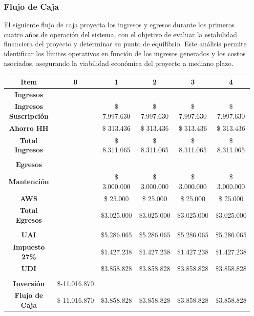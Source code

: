 \documentclass[12pt]{article}
\begin{document}
\subsubsection{Flujo de Caja}
El siguiente flujo de caja proyecta los ingresos y egresos durante los primeros cuatro años de operación del sistema, con el objetivo de evaluar la estabilidad financiera del proyecto y determinar su punto de equilibrio. Este análisis permite identificar los límites operativos en función de los ingresos generados y los costos asociados, asegurando la viabilidad económica del proyecto a mediano plazo.
\begin{table}[!h]
    \centering
    \begin{tabular}{|c|c|c|c|c|c|}
        \hline
         \textbf{Item} & 0 & 1 & 2 & 3 & 4 \\
         \hline
         \textbf{Ingresos}&&&&&\\
         \hline
         \textbf{Ingresos Suscripción} & & \$ 7.997.630 & \$ 7.997.630 & \$ 7.997.630 & \$ 7.997.630 \\
         \textbf{Ahorro HH} & & \$ 313.436 & \$ 313.436 & \$ 313.436 & \$ 313.436 \\
         \textbf{Total Ingresos} & & \$ 8.311.065 &\$ 8.311.065&\$ 8.311.065&\$ 8.311.065\\
         \hline
         &&&&& \\
         \hline
         \textbf{Egresos}&&&&&\\
         \hline
         \textbf{Mantención} & & \$ 3.000.000 & \$ 3.000.000 & \$ 3.000.000 & \$ 3.000.000 \\
         \textbf{AWS} & & \$ 25.000 &\$ 25.000 &\$ 25.000 &\$ 25.000\\
         \textbf{Total Egresos} && \$3.025.000&\$3.025.000&\$3.025.000&\$3.025.000\\
         \hline
         &&&&&\\
         \hline
         \textbf{UAI}&&\$5.286.065&\$5.286.065&\$5.286.065&\$5.286.065\\
         \textbf{Impuesto 27\%}&&\$1.427.238&\$1.427.238&\$1.427.238&\$1.427.238\\
         \textbf{UDI}&&\$3.858.828&\$3.858.828&\$3.858.828&\$3.858.828\\
         \hline
         &&&&&\\
         \hline
         \textbf{Inversión} &\$-11.016.870&&&&\\
         \textbf{Flujo de Caja}&\$-11.016.870&\$3.858.828&\$3.858.828&\$3.858.828&\$3.858.828\\

\end{tabular}
\end{table}
\end{document}
